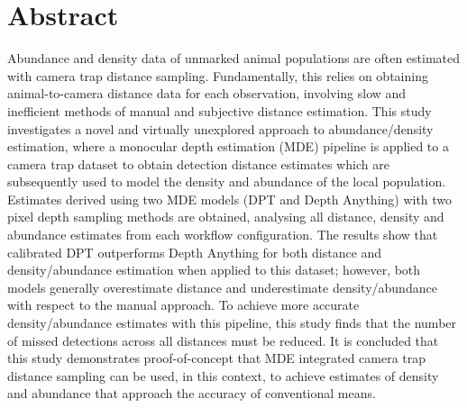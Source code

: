 \part*{Abstract}

Abundance and density data of unmarked animal populations are often estimated with camera trap
distance sampling.
Fundamentally, this relies on obtaining animal-to-camera distance data for each observation,
involving slow and inefficient methods of manual and subjective distance estimation.
This study investigates a novel and virtually unexplored approach to abundance/density estimation,
where a monocular depth estimation (MDE) pipeline is applied to a camera trap dataset to obtain detection
distance estimates which are subsequently used to model the density and abundance of the local population.
Estimates derived using two MDE models (DPT and Depth Anything) with two pixel depth sampling methods are
obtained, analysing all distance, density and abundance estimates from each workflow configuration.
The results show that calibrated DPT outperforms Depth Anything for both distance and
density/abundance estimation when applied to this dataset; however, both models generally overestimate
distance and underestimate density/abundance with respect to the manual approach.
To achieve more accurate density/abundance estimates with this pipeline, this study finds that the number
of missed detections across all distances must be reduced.
It is concluded that this study demonstrates proof-of-concept that MDE integrated camera trap distance
sampling can be used, in this context, to achieve estimates of density and abundance that approach
the accuracy of conventional means.
